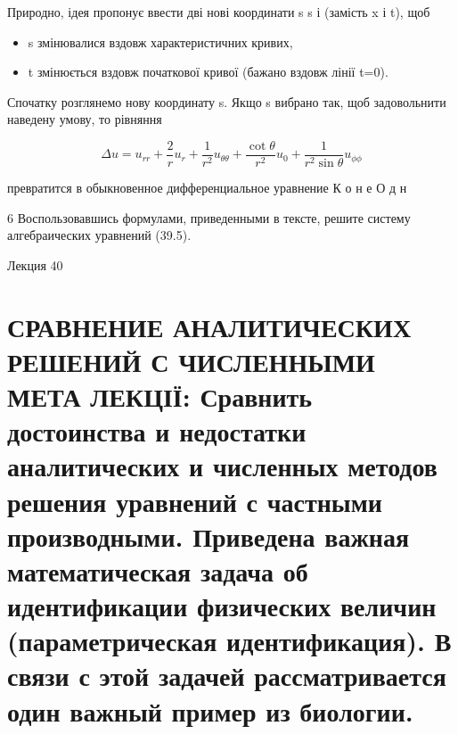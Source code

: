 \documentclass[
  ukrainian,
]{article}
\providecommand{\tightlist}{%
  \setlength{\itemsep}{0pt}\setlength{\parskip}{0pt}}
\begin{document}
Природно, ідея пропонує ввести дві нові координати s s і \tau (замість x
і t), щоб

\begin{itemize}
\tightlist
\item
  s змінювалися вздовж характеристичних кривих,
\item
  t змінюється вздовж початкової кривої (бажано вздовж лінії t=0).
\end{itemize}

Спочатку розглянемо нову координату s. Якщо s вибрано так, щоб
задовольнити наведену умову, то рівняння

\[
\Delta u = u_{rr} + \frac{2}{r}u_r + \frac{1}{r^2}u_{\theta\theta} + \frac{\cot\theta}{r^2}u_0 + \frac{1}{r^2\sin\theta}u_{\phi\phi}
\]

превратится в обыкновенное дифференциальное уравнение К о н е О д н

6 Воспользовавшись формулами, приведенными в тексте, решите систему
алгебраических уравнений (39.5).

Лекция 40

\section{СРАВНЕНИЕ АНАЛИТИЧЕСКИХ РЕШЕНИЙ С ЧИСЛЕННЫМИ МЕТА ЛЕКЦІЇ:
Сравнить достоинства и недостатки аналитических и численных методов
решения уравнений с частными производными. Приведена важная
математическая задача об идентификации физических величин
(параметрическая идентификация). В связи с этой задачей рассматривается
один важный пример из
биологии.}\label{ux441ux440ux430ux432ux43dux435ux43dux438ux435-ux430ux43dux430ux43bux438ux442ux438ux447ux435ux441ux43aux438ux445-ux440ux435ux448ux435ux43dux438ux439-ux441-ux447ux438ux441ux43bux435ux43dux43dux44bux43cux438-ux43cux435ux442ux430-ux43bux435ux43aux446ux456ux457-ux441ux440ux430ux432ux43dux438ux442ux44c-ux434ux43eux441ux442ux43eux438ux43dux441ux442ux432ux430-ux438-ux43dux435ux434ux43eux441ux442ux430ux442ux43aux438-ux430ux43dux430ux43bux438ux442ux438ux447ux435ux441ux43aux438ux445-ux438-ux447ux438ux441ux43bux435ux43dux43dux44bux445-ux43cux435ux442ux43eux434ux43eux432-ux440ux435ux448ux435ux43dux438ux44f-ux443ux440ux430ux432ux43dux435ux43dux438ux439-ux441-ux447ux430ux441ux442ux43dux44bux43cux438-ux43fux440ux43eux438ux437ux432ux43eux434ux43dux44bux43cux438.-ux43fux440ux438ux432ux435ux434ux435ux43dux430-ux432ux430ux436ux43dux430ux44f-ux43cux430ux442ux435ux43cux430ux442ux438ux447ux435ux441ux43aux430ux44f-ux437ux430ux434ux430ux447ux430-ux43eux431-ux438ux434ux435ux43dux442ux438ux444ux438ux43aux430ux446ux438ux438-ux444ux438ux437ux438ux447ux435ux441ux43aux438ux445-ux432ux435ux43bux438ux447ux438ux43d-ux43fux430ux440ux430ux43cux435ux442ux440ux438ux447ux435ux441ux43aux430ux44f-ux438ux434ux435ux43dux442ux438ux444ux438ux43aux430ux446ux438ux44f.-ux432-ux441ux432ux44fux437ux438-ux441-ux44dux442ux43eux439-ux437ux430ux434ux430ux447ux435ux439-ux440ux430ux441ux441ux43cux430ux442ux440ux438ux432ux430ux435ux442ux441ux44f-ux43eux434ux438ux43d-ux432ux430ux436ux43dux44bux439-ux43fux440ux438ux43cux435ux440-ux438ux437-ux431ux438ux43eux43bux43eux433ux438ux438.}
\end{document}
